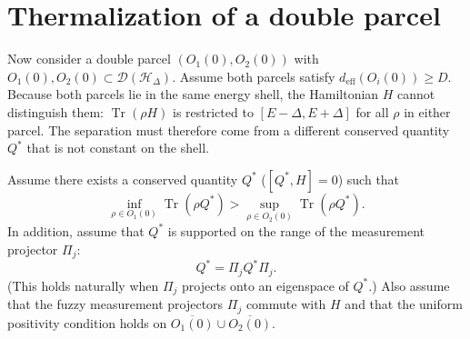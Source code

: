 \documentclass[11pt, onecolumn]{article}
\begin{document}
\section{Thermalization of a double parcel}

Now consider a double parcel \((O_1(0),O_2(0))\) with \(O_1(0),O_2(0)\subset\mathcal{D}(\mathcal{H}_{\Delta})\). Assume both parcels satisfy \(d_{\mathrm{eff}}(O_i(0))\ge D\). Because both parcels lie in the same energy shell, the Hamiltonian \(H\) cannot distinguish them: \(\operatorname{Tr}(\rho H)\) is restricted to \([E-\Delta, E+\Delta]\) for all \(\rho\) in either parcel. The separation must therefore come from a different conserved quantity \(Q^*\) that is not constant on the shell.

Assume there exists a conserved quantity \(Q^*\) (\([Q^*,H]=0\)) such that
\[
\inf_{\rho\in O_1(0)}\operatorname{Tr}(\rho Q^*) > \sup_{\rho\in O_2(0)}\operatorname{Tr}(\rho Q^*).
\]
In addition, assume that \(Q^*\) is supported on the range of the measurement projector \(\Pi_j\):
\[
Q^* = \Pi_j Q^* \Pi_j.
\]
(This holds naturally when \(\Pi_j\) projects onto an eigenspace of \(Q^*\).) Also assume that the fuzzy measurement projectors \(\Pi_j\) commute with \(H\) and that the uniform positivity condition holds on \(\overline{O_1(0)}\cup\overline{O_2(0)}\).
\end{document}
